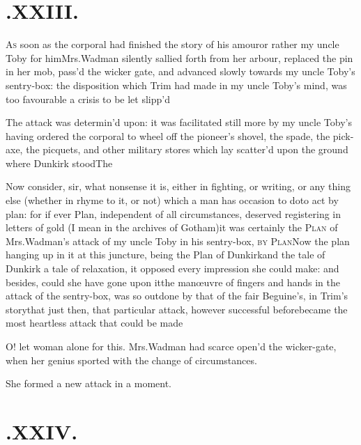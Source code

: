 \documentclass{article}
\begin{document}
\vfill{}\eject\null
\section{.\enspace XXIII.}

\lettrine{A}{s} soon as the corporal had finished\break
the story of his amour\tsh or rather my uncle Toby for
him\tsk Mrs.\break Wadman silently sallied forth from her
arbour, replaced the pin in her mob, pass’d the wicker gate,
and advanced slowly towards my uncle Toby’s
sentry-box: the disposition which Trim had made in my uncle
Toby’s mind, was too favourable a crisis to be let
slipp’d\tsh

\tsh The attack was determin’d upon: it was facilitated still more by my uncle
Toby’s having ordered the corporal to wheel off the pioneer’s shovel, the spade, the
pick-axe, the picquets, and other military stores which lay scatter’d upon the
ground where Dunkirk stood\tsk The 

Now consider, sir, what nonsense it is, either in fighting, or
writing, or any thing else (whether in rhyme to it, or not) which a
man has occasion to do\tsk\break to act by plan: for if ever Plan,
independent of all circumstances, deserved registering in letters
of gold (I mean in the archives of Gotham)\tsk it was
certainly the \textsc{Plan} of Mrs.\@ Wadman’s
attack of my uncle Toby in his sentry-box, \textsc{by}
\textsc{Plan}\tsh Now the plan hanging up in it at
this juncture, being the Plan of Dunkirk\tsk and the tale
of Dunkirk a tale of relaxation, it opposed every impression
she could make: and besides, could she have gone upon it\tsk the
manœuvre of fingers and hands in the attack of the
sentry-box, was so outdone by that of the fair Beguine’s, in Trim’s
story\tsk that just then, that particular attack, however
successful before\tsk became the most heartless attack that could
be made\tsh

O! let woman alone for this. Mrs.\@ Wadman had scarce
open’d the wicker-gate, when her genius sported with the
change of circumstances.

\tsh She formed a new attack in a moment.

\vfill{}\eject\null
\section{.\enspace XXIV.}
\end{document}
